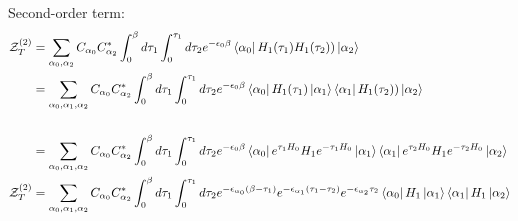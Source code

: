\documentclass[12pt, two sided]{article}
\begin{document}
Second-order term:
\begin{equation}
\begin{aligned}
\mathcal{Z}_T^{(2)} &=  \sum_{\alpha_0, \alpha_2} C_{\alpha_0} C_{\alpha_2}^{*} \int_0^{\beta} d\tau_1 \int_{0}^{\tau_1} d\tau_2 e^{-\epsilon_{0} \beta} \bra{\alpha_0}  H_1(\tau_1) H_1(\tau_2) ) \ket{\alpha_2} \\
&= \sum_{\alpha_0, \alpha_1, \alpha_2} C_{\alpha_0} C_{\alpha_2}^{*} \int_0^{\beta} d\tau_1 \int_{0}^{\tau_1} d\tau_2 e^{-\epsilon_{0} \beta} \bra{\alpha_0}  H_1(\tau_1) \ket{\alpha_1} \bra{\alpha_1}   H_1(\tau_2) )  \ket{\alpha_2} \\
\\
&= \sum_{\alpha_0, \alpha_1, \alpha_2} C_{\alpha_0} C_{\alpha_2}^{*} \int_0^{\beta} d\tau_1 \int_{0}^{\tau_1} d\tau_2 e^{-\epsilon_{0} \beta} \bra{\alpha_0}  e^{\tau_1 H_0}H_1e^{-\tau_1 H_0}  \ket{\alpha_1} \bra{\alpha_1} e^{\tau_2 H_0}H_1e^{-\tau_2 H_0}  \ket{\alpha_2} \\
\mathcal{Z}_T^{(2)} &= \sum_{\alpha_0, \alpha_1, \alpha_2} C_{\alpha_0} C_{\alpha_2}^{*} \int_0^{\beta} d\tau_1 \int_{0}^{\tau_1} d\tau_2 e^{-\epsilon_{\alpha_0}(\beta-\tau_1)} e^{-\epsilon_{\alpha_1}(\tau_1-\tau_2)} e^{-\epsilon_{\alpha_2} \tau_2} \bra{\alpha_0} H_1 \ket{\alpha_1} \bra{\alpha_1} H_1 \ket{\alpha_2}
\end{aligned}
\end{equation}
\end{document}
